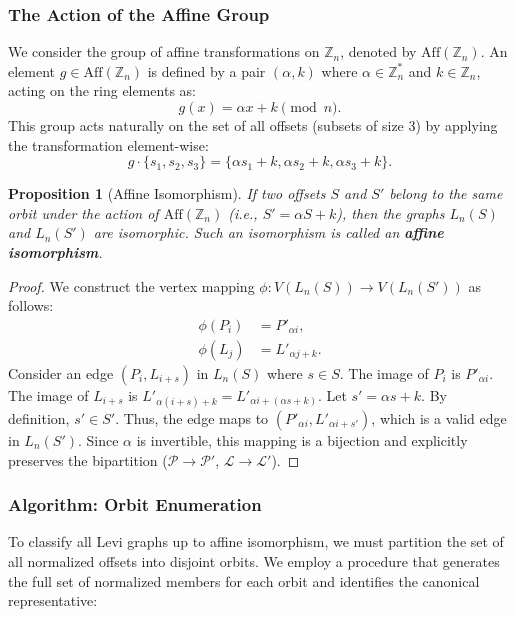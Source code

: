 \documentclass[12pt,letterpaper]{amsart}
\newtheorem{proposition}{Proposition}
\begin{document}
\subsubsection{The Action of the Affine Group}

We consider the group of affine transformations on $\mathbb{Z}_n$, denoted by $\mathrm{Aff}(\mathbb{Z}_n)$. An element $g \in \mathrm{Aff}(\mathbb{Z}_n)$ is defined by a pair $(\alpha, k)$ where $\alpha \in \mathbb{Z}_n^*$ and $k \in \mathbb{Z}_n$, acting on the ring elements as:
\[
g(x) = \alpha x + k \pmod n.
\]
This group acts naturally on the set of all offsets (subsets of size 3) by applying the transformation element-wise:
\[
g \cdot \{s_1, s_2, s_3\} = \{ \alpha s_1 + k, \alpha s_2 + k, \alpha s_3 + k \}.
\]

\begin{proposition}[Affine Isomorphism]
If two offsets $S$ and $S'$ belong to the same orbit under the action of $\mathrm{Aff}(\mathbb{Z}_n)$ (i.e., $S' = \alpha S + k$), then the graphs $L_n(S)$ and $L_n(S')$ are isomorphic. Such an isomorphism is called an \textbf{affine isomorphism}.
\end{proposition}

\begin{proof}
We construct the vertex mapping $\phi: V(L_n(S)) \to V(L_n(S'))$ as follows:
\begin{align*}
\phi(P_i) &= P'_{\alpha i}, \\
\phi(L_j) &= L'_{\alpha j + k}.
\end{align*}
Consider an edge $(P_i, L_{i+s})$ in $L_n(S)$ where $s \in S$.
The image of $P_i$ is $P'_{\alpha i}$.
The image of $L_{i+s}$ is $L'_{\alpha(i+s) + k} = L'_{\alpha i + (\alpha s + k)}$.
Let $s' = \alpha s + k$. By definition, $s' \in S'$.
Thus, the edge maps to $(P'_{\alpha i}, L'_{\alpha i + s'})$, which is a valid edge in $L_n(S')$. Since $\alpha$ is invertible, this mapping is a bijection and explicitly preserves the bipartition ($\mathcal{P} \to \mathcal{P}'$, $\mathcal{L} \to \mathcal{L}'$).
\end{proof}

\subsubsection{Algorithm: Orbit Enumeration}

To classify all Levi graphs up to affine isomorphism, we must partition the set of all normalized offsets into disjoint orbits. We employ a procedure that generates the full set of normalized members for each orbit and identifies the canonical representative:
\end{document}
